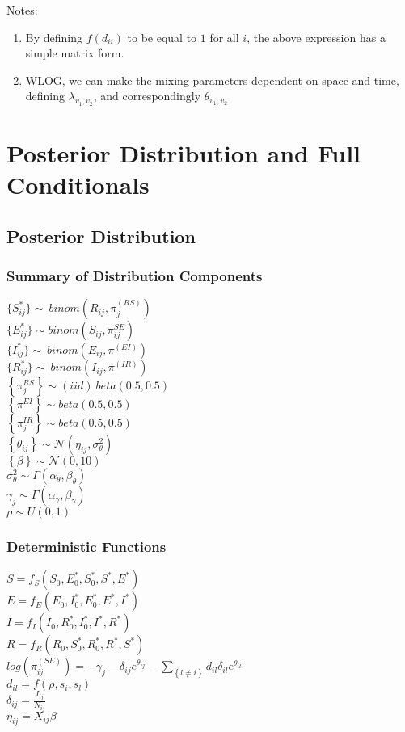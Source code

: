 \documentclass[12pt]{article}
\newcommand \noi {\noindent}
\newcommand \mbreak {\\ \vspace{0.1in}}
\begin{document}
Notes: 
\begin{enumerate}
    \item By defining $f(d_{ii})$ to be equal to $1$ for all $i$, the above expression has a simple 
        matrix form. 
    \item WLOG, we can make the mixing parameters dependent on space and time, defining $\lambda_{v_1, v_2}$,
        and correspondingly $\theta_{v_1,v_2}$

\end{enumerate}


\section{Posterior Distribution and Full Conditionals}

\subsection{Posterior Distribution}
\subsubsection{Summary of Distribution Components}
$\{S_{ij}^*\} \sim\  binom(R_{ij}, \pi_j^{(RS)})$\mbreak
$\{E_{ij}^*\} \sim binom(S_{ij}, \pi^{SE}_{ij})$ \mbreak
$\{I_{ij}^*\} \sim\  binom(E_{ij}, \pi^{(EI)})$\mbreak
$\{R_{ij}^*\} \sim\  binom(I_{ij}, \pi^{(IR)})$\mbreak
\noi
$\left\{\pi_j^{RS}  \right\} \sim (iid)\ beta(0.5, 0.5)$\mbreak 
$\left\{\pi^{EI}  \right\} \sim beta(0.5, 0.5)$\mbreak 
$\left\{\pi_j^{IR}  \right\} \sim beta(0.5, 0.5)$\mbreak 
$\left\{ \theta_{ij}\right\} \sim \mathcal{N}(\eta_{ij}, \sigma^2_{\theta})$ \mbreak
$\left\{ \beta \right\} \sim \mathcal{N}(0, 10) $\mbreak 
$\sigma^2_{\theta} \sim \Gamma(\alpha_\theta, \beta_\theta)$\mbreak
$\gamma_j \sim \Gamma(\alpha_\gamma, \beta_\gamma)$\mbreak
$\rho \sim U(0,1)$

\subsubsection{Deterministic Functions}
$S = f_S(S_0, E^*_0, S^*_0, S^*, E^*)$ \mbreak
$E = f_E(E_0, I^*_0, E^*_0, E^*, I^*)$ \mbreak
$I = f_I(I_0, R^*_0, I^*_0, I^*, R^*)$ \mbreak
$R = f_R(R_0, S^*_0, R^*_0, R^*, S^*)$ \mbreak
$\displaystyle log(\pi^{(SE)}_{ij}) = -\gamma_j-\delta_{ij}e^{\theta_{ij}} - \sum_{\left\{ l \ne i \right\}}d_{il}\delta_{il}e^{\theta_{il}}$\mbreak
$d_{il} = f(\rho, s_i, s_l)$\mbreak
$\delta_{ij} = \frac{I_{ij}}{N_{ij}}$ \mbreak
$\eta_{ij} = X_{ij}\beta$
\end{document}

